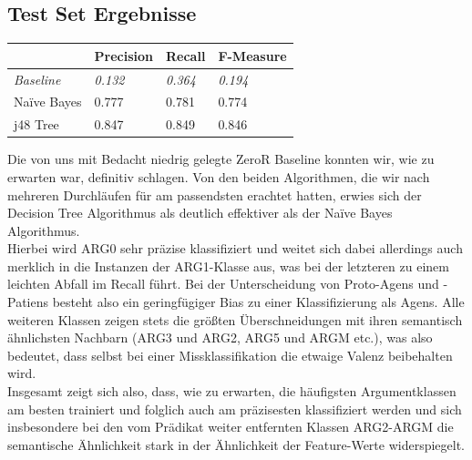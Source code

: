 \documentclass[]{article}
\begin{document}
\subsection{Test Set Ergebnisse}
\begin{table}[h]
\begin{tabular}{l|lll}
                  & Precision      & Recall         & F-Measure      \\ \hline
\textit{Baseline} & \textit{0.132} & \textit{0.364} & \textit{0.194} \\ \hline
Naïve Bayes       & 0.777          & 0.781          & 0.774          \\
j48 Tree          & 0.847      	   & 0.849            & 0.846          
\end{tabular}
\end{table}

Die von uns mit Bedacht niedrig gelegte ZeroR Baseline konnten wir, wie zu erwarten war, definitiv schlagen. Von den beiden Algorithmen, die wir nach mehreren Durchläufen für am passendsten erachtet hatten, erwies sich der Decision Tree Algorithmus als deutlich effektiver als der Naïve Bayes Algorithmus.\\
Hierbei wird ARG0 sehr präzise klassifiziert und weitet sich dabei allerdings auch merklich in die Instanzen der ARG1-Klasse aus, was bei der letzteren zu einem leichten Abfall im Recall führt. Bei der Unterscheidung von Proto-Agens und -Patiens besteht also ein geringfügiger Bias zu einer Klassifizierung als Agens. Alle weiteren Klassen zeigen stets die größten Überschneidungen mit ihren semantisch ähnlichsten Nachbarn (ARG3 und ARG2, ARG5 und ARGM etc.), was also bedeutet, dass selbst bei einer Missklassifikation die etwaige Valenz beibehalten wird.\\
Insgesamt zeigt sich also, dass, wie zu erwarten, die häufigsten Argumentklassen am besten trainiert und folglich auch am präzisesten klassifiziert werden und sich insbesondere bei den vom Prädikat weiter entfernten Klassen ARG2-ARGM die semantische Ähnlichkeit stark in der Ähnlichkeit der Feature-Werte widerspiegelt.
\end{document}
